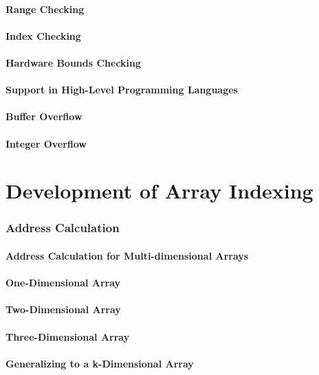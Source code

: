 \documentclass[12pt, oneside]{book}
\begin{document}
\subsubsection{Range Checking}
\subsubsection{Index Checking}
\subsubsection{Hardware Bounds Checking}
\subsubsection{Support in High-Level Programming Languages}
\subsubsection{Buffer Overflow}
\subsubsection{Integer Overflow}
\chapter{Development of Array Indexing}
\subsection{Address Calculation}
\subsubsection{Address Calculation for Multi-dimensional Arrays}
\subsubsection{One-Dimensional Array}
\subsubsection{Two-Dimensional Array}
\subsubsection{Three-Dimensional Array}
\subsubsection{Generalizing to a k-Dimensional Array}
\end{document}
